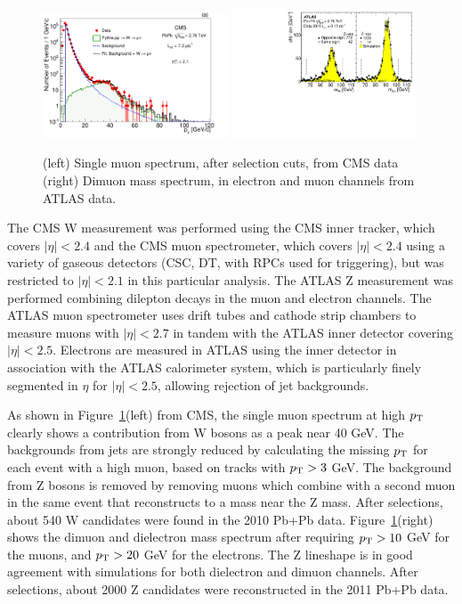 \begin{figure}[!htb]
\begin{center}
\includegraphics[width=0.49\textwidth]{electroweak_figs/Fig1a.pdf}
\includegraphics[width=0.49\textwidth]{electroweak_figs/fig_01.pdf}
\caption[]{(left) Single muon spectrum, after selection cuts, from CMS data (right) Dimuon mass spectrum, in electron and muon channels from ATLAS data.}
\label{fig:pas:zw_signal}
\end{center}
\end{figure}
The CMS W measurement was performed using the CMS inner tracker, which covers $|\eta|<2.4$ 
and the CMS muon spectrometer, which covers $|\eta|<2.4$ using a variety of gaseous detectors
(CSC, DT, with RPCs used for triggering), but was restricted to $|\eta|<2.1$ in this particular analysis.
The ATLAS Z measurement was performed combining dilepton decays in the muon and electron channels.
The ATLAS muon spectrometer uses drift tubes and cathode strip chambers to measure muons with $|\eta|<2.7$
in tandem with the ATLAS inner detector covering $|\eta|<2.5$.
Electrons are measured in ATLAS using the inner detector in association with the ATLAS calorimeter system, 
which is particularly finely segmented in $\eta$ for $|\eta|<2.5$, allowing rejection of jet backgrounds.

As shown in Figure~\ref{fig:pas:zw_signal}(left) from CMS, the single muon spectrum at high $\mbox{$p_{\mathrm{T}}$}$ clearly shows a contribution
from W bosons as a peak near 40 GeV.  
The backgrounds from jets are strongly reduced by calculating the missing $\mbox{$p_{\mathrm{T}}$}$ for each event with a
high \pT muon, based on tracks with $\mbox{$p_{\mathrm{T}}$}>3$ GeV.  The background from Z bosons is removed by removing muons which
combine with a second muon in the same event that reconstructs to a mass near the Z mass.
After selections, about 540 W candidates were found in the 2010 Pb+Pb data.
%
Figure~\ref{fig:pas:zw_signal}(right) shows the dimuon and dielectron mass spectrum after requiring $\mbox{$p_{\mathrm{T}}$}>10$ GeV for
the muons, and $\mbox{$p_{\mathrm{T}}$}>20$ GeV for the electrons.  The Z lineshape is in good agreement with simulations for both
dielectron and dimuon channels.
After selections, about 2000 Z candidates were reconstructed in the 2011 Pb+Pb data.

